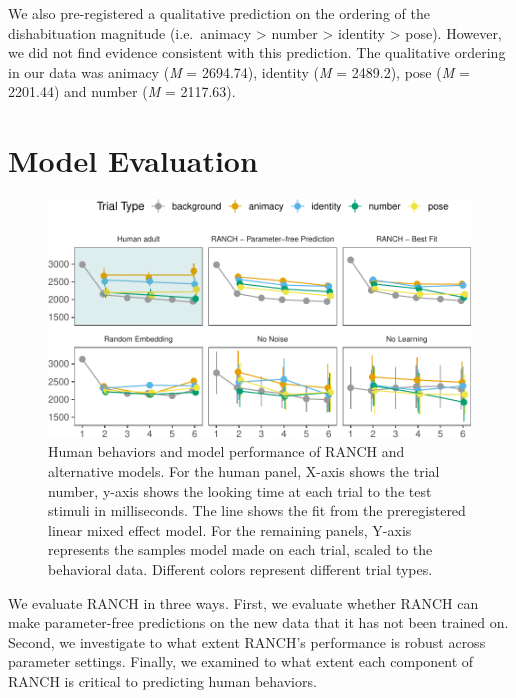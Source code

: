 \documentclass[10pt, letterpaper]{article}
\newenvironment{CodeChunk}{}{}
\begin{document}
We also pre-registered a qualitative prediction on the ordering of the
dishabituation magnitude (i.e.~animacy \textgreater{} number
\textgreater{} identity \textgreater{} pose). However, we did not find
evidence consistent with this prediction. The qualitative ordering in
our data was animacy (\emph{M} = 2694.74), identity (\emph{M} = 2489.2),
pose (\emph{M} = 2201.44) and number (\emph{M} = 2117.63).

\hypertarget{model-evaluation}{%
\section{Model Evaluation}\label{model-evaluation}}

\begin{CodeChunk}
\begin{figure}[h!]

{\centering \includegraphics{figs/lol-1} 

}

\caption[Human behaviors and model performance of RANCH and alternative models]{Human behaviors and model performance of RANCH and alternative models. For the human panel, X-axis shows the trial number, y-axis shows the looking time at each trial to the test stimuli in milliseconds. The line shows the fit from the preregistered linear mixed effect model. For the remaining panels, Y-axis represents the samples model made on each trial, scaled to the behavioral data. Different colors represent different trial types.}\label{fig:lol}
\end{figure}
\end{CodeChunk}

We evaluate RANCH in three ways. First, we evaluate whether RANCH can
make parameter-free predictions on the new data that it has not been
trained on. Second, we investigate to what extent RANCH's performance is
robust across parameter settings. Finally, we examined to what extent
each component of RANCH is critical to predicting human behaviors.
\end{document}
